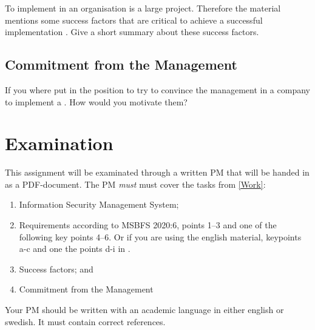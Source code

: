 \documentclass[a4paper]{article}
\begin{document}
To implement  in an organisation is a large project. Therefore
the material mentions some success factors that are critical to achieve a
successful implementation \cite[4.6]{iso27000}. Give a short summary about
these success factors.

\subsection{Commitment from the Management}
If you where put in the position to try to convince the management in a company
to implement a . How would you motivate them?

\section{Examination}
\label{sec:examination}

This assignment will be examinated through a written PM that will be handed in
as a PDF-document.
The PM \emph{must} must cover the tasks from \cref{Work}:

\begin{enumerate}
  \item Information Security Management System;
  \item Requirements according to MSBFS 2020:6, points 1--3 and one of the
    following key points 4--6. Or if you are using the english material,
    keypoints a-c and one the points d-i in \cite[chap. 4.2.1]{iso27000}.
  \item Success factors; and
  \item Commitment from the Management
\end{enumerate}

Your PM should be written with an academic language in either english or
swedish. It must contain correct references.

\printbibliography{}
\end{document}
